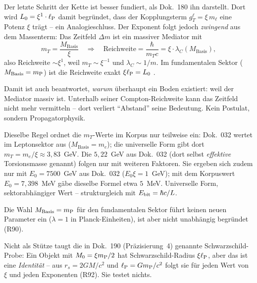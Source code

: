 \begin{tcolorbox}[proofbox, title={Der Boden folgt aus dem Lagrangian \B\ (R89/R90)}]
  Der letzte Schritt der Kette ist besser fundiert, als Dok.~180 ihn
  darstellt. Dort wird $L_0 = \xi^1\cdot\ell_{\mathrm{P}}$ damit begründet, dass der
  Kopplungsterm $g_T^\ell = \xi\, m_\ell$ eine Potenz $\xi$ trägt -- ein
  Analogieschluss. Der Exponent folgt jedoch \emph{zwingend} aus dem
  Massenterm: Das Zeitfeld $\Delta m$ ist ein massiver Mediator mit
  \begin{equation}
    m_T = \frac{M_{\mathrm{Basis}}}{\xi}
    \quad\Longrightarrow\quad
    \text{Reichweite} = \frac{\hbar}{m_T c}
    = \xi\cdot\lambda_C(M_{\mathrm{Basis}}),
  \end{equation}
  also Reichweite $\sim\xi^1$, weil $m_T\sim\xi^{-1}$ und
  $\lambda_C\sim 1/m$. Im fundamentalen Sektor ($M_{\mathrm{Basis}} = m_{\mathrm{P}}$)
  ist die Reichweite exakt $\xi\ell_{\mathrm{P}} = L_0$ \B.

  Damit ist auch beantwortet, \emph{warum} überhaupt ein Boden existiert:
  weil der Mediator massiv ist. Unterhalb seiner Compton-Reichweite kann
  das Zeitfeld nicht mehr vermitteln -- dort verliert \enquote{Abstand}
  seine Bedeutung. Kein Postulat, sondern Propagatorphysik.

  Dieselbe Regel ordnet die $m_T$-Werte im Korpus nur teilweise ein:
  Dok.~032 wertet im Leptonsektor aus ($M_{\mathrm{Basis}} = m_e$); die
  universelle Form gibt dort $m_T = m_e/\xi \approx 3{,}83$~GeV. Die
  $5{,}22$~GeV aus Dok.~032 (dort selbst \emph{effektive} Torsionsmasse
  genannt) folgen nur mit weiteren Faktoren.
  Sie ergeben sich zudem nur mit $E_0 = 7500$~GeV aus Dok.~032 ($E_0\xi = 1$~GeV);
  mit dem Korpuswert $E_0 = 7{,}398$~MeV gäbe dieselbe Formel etwa $5$~MeV.
  Universelle Form,
  sektorabhängiger Wert -- strukturgleich mit $E_{\mathrm{bit}} = \hbar c/L$.
\end{tcolorbox}

\begin{tcolorbox}[warnbox, title={Was offen bleibt \S}]
  Die Wahl $M_{\mathrm{Basis}} = m_{\mathrm{P}}$ für den fundamentalen Sektor führt
  keinen neuen Parameter ein ($\lambda = 1$ in Planck-Einheiten), ist aber
  nicht unabhängig begründet (R90).

  Nicht als Stütze taugt die in Dok.~190 (Präzisierung~4) genannte
  Schwarzschild-Probe: Ein Objekt mit $M_0 = \xi m_{\mathrm{P}}/2$ hat
  Schwarzschild-Radius $\xi\ell_{\mathrm{P}}$, aber das ist eine \emph{Identität} --
  aus $r_s = 2GM/c^2$ und $\ell_{\mathrm{P}} = Gm_{\mathrm{P}}/c^2$ folgt sie für jeden Wert von
  $\xi$ und jeden Exponenten (R92). Sie testet nichts.
\end{tcolorbox}

